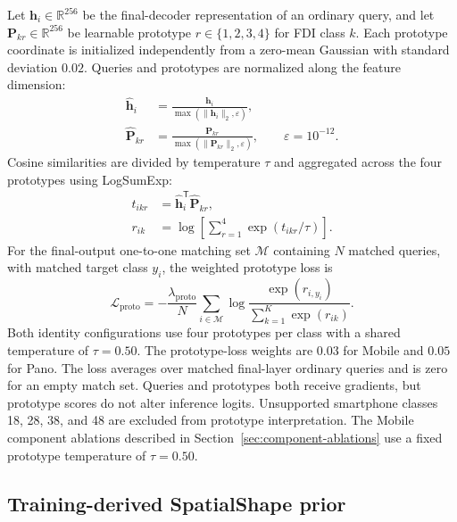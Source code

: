 \documentclass[a4paper,fleqn]{cas-dc}
\begin{document}
Let $\mathbf h_i\in\mathbb R^{256}$ be the final-decoder representation of an ordinary query, and let $\mathbf P_{kr}\in\mathbb R^{256}$ be learnable prototype $r\in\{1,2,3,4\}$ for FDI class $k$. Each prototype coordinate is initialized independently from a zero-mean Gaussian with standard deviation $0.02$. Queries and prototypes are normalized along the feature dimension:
\begin{equation}
 \begin{aligned}
 \widehat{\mathbf h}_i
  &=\frac{\mathbf h_i}{\max(\lVert\mathbf h_i\rVert_2,\varepsilon)},\\
 \widehat{\mathbf P}_{kr}
  &=\frac{\mathbf P_{kr}}{\max(\lVert\mathbf P_{kr}\rVert_2,\varepsilon)},
 \qquad \varepsilon=10^{-12}.
 \end{aligned}
 \label{eq:prototype-normalization}
\end{equation}
Cosine similarities are divided by temperature $\tau$ and aggregated across the four prototypes using LogSumExp:
\begin{equation}
 \begin{aligned}
 t_{ikr}&=\widehat{\mathbf h}_i^{\mathsf T}\widehat{\mathbf P}_{kr},\\
 r_{ik}&=\log\left[\sum_{r=1}^{4}\exp(t_{ikr}/\tau)\right].
 \end{aligned}
 \label{eq:prototype-score}
\end{equation}
For the final-output one-to-one matching set $\mathcal M$ containing $N$ matched queries, with matched target class $y_i$, the weighted prototype loss is
\begin{equation}
 \mathcal L_{\mathrm{proto}}
 =-\frac{\lambda_{\mathrm{proto}}}{N}
  \sum_{i\in\mathcal M}\log
  \frac{\exp(r_{i,y_i})}{\sum_{k=1}^{K}\exp(r_{ik})}.
 \label{eq:prototype-loss}
\end{equation}
Both identity configurations use four prototypes per class with a shared temperature of $\tau=0.50$. The prototype-loss weights are $0.03$ for Mobile and $0.05$ for Pano. The loss averages over matched final-layer ordinary queries and is zero for an empty match set. Queries and prototypes both receive gradients, but prototype scores do not alter inference logits. Unsupported smartphone classes 18, 28, 38, and 48 are excluded from prototype interpretation. The Mobile component ablations described in Section~\ref{sec:component-ablations} use a fixed prototype temperature of $\tau=0.50$.

\subsection{Training-derived SpatialShape prior}
\label{sec:spatialshape}
\end{document}
